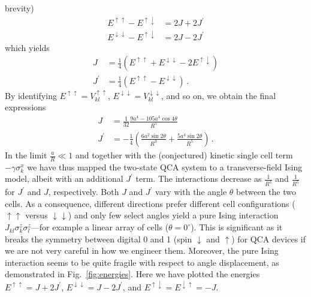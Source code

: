 brevity)
%
\begin{align}
  E^{\uparrow\uparrow} - E^{\uparrow\downarrow} &= 2J + 2J^{\prime} \\
  E^{\downarrow\downarrow} - E^{\uparrow\downarrow} &= 2J - 2J^{\prime}
\end{align}
%
which yields
%
\begin{align}
  J &= \frac{1}{4} 
  \left( 
    E^{\uparrow\uparrow} + E^{\downarrow\downarrow} - 2 E^{\uparrow\downarrow} 
  \right) \\
  J^{\prime} &= \frac{1}{4}
  \left( E^{\uparrow\uparrow} - E^{\downarrow\downarrow} \right) \, .
\end{align}
%
By identifying $E^{\uparrow\uparrow} = V^{\uparrow\uparrow}_{kl}$,
$E^{\downarrow\downarrow} = V^{\downarrow\downarrow}_{kl}$, and so on, we obtain
the final expressions
% 
\begin{align}
  J 
  &=
  \frac{1}{32}
  \frac{9 a^4 - 105 a^4 \cos{4\theta}}{R^5} \\
  J^{\prime}
  &=
  - \frac{1}{4}
  \left(
    \frac{6 a^2 \sin{2\theta}}{R^3} + \frac{5 a^4 \sin{2\theta}}{R^5}
  \right) \, .
\end{align}
%
In the limit $\frac{a}{R} \ll 1$ and together with the (conjectured) kinetic
single cell term $-\gamma \sigma^x_k$ we have thus mapped the two-state QCA
system to a transverse-field Ising model, albeit with an additional $J^{\prime}$
term. The interactions decrease as $\frac{1}{R^3}$ and $\frac{1}{R^5}$ for
$J^{\prime}$ and $J$, respectively. Both $J$ and $J^{\prime}$ vary with the
angle $\theta$ between the two cells. As a consequence, different directions
prefer different cell configurations ($\uparrow\uparrow$ versus
$\downarrow\downarrow$) and only few select angles yield a pure Ising
interaction $J_{kl} \sigma^z_k \sigma^z_l$---for example a linear array of cells
($\theta = 0^{\circ}$). This is significant as it breaks the symmetry between
digital 0 and 1 (spin $\downarrow$ and $\uparrow$) for QCA devices if we are not
very careful in how we engineer them. Moreover, the pure Ising interaction seems
to be quite fragile with respect to angle displacement, as demonstrated in
Fig.~\ref{fig:energies}. Here we have plotted the energies $E^{\uparrow\uparrow}
= J + 2 J^{\prime}$, $E^{\downarrow\downarrow} = J - 2 J^{\prime}$, and
$E^{\uparrow\downarrow} = E^{\downarrow\uparrow} = - J$.
